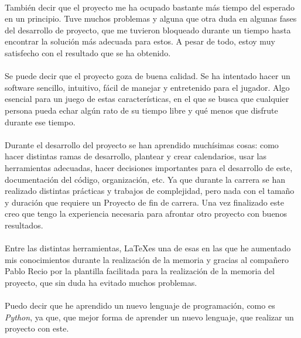 \documentclass[a4paper,11pt]{article} %
\begin{document}
\paragraph{}
También decir que el proyecto me ha ocupado bastante más tiempo del esperado en un principio. Tuve muchos problemas y alguna que 
otra duda en algunas fases del desarrollo de proyecto, que me tuvieron bloqueado durante un tiempo hasta encontrar la solución
más adecuada para estos. A pesar de todo, estoy muy satisfecho con el resultado que se ha obtenido.

\paragraph{}
Se puede decir que el proyecto goza de buena calidad. Se ha intentado hacer un
software sencillo, intuitivo, fácil de manejar y 
entretenido para el jugador. Algo esencial para un juego de estas características, en el que se busca que cualquier persona
pueda echar algún rato de su tiempo libre y qué menos que disfrute durante ese tiempo.

\paragraph{}
Durante el desarrollo del proyecto se han aprendido muchísimas cosas: como hacer distintas ramas de desarrollo, plantear y crear
calendarios, usar las herramientas adecuadas, hacer decisiones importantes para el desarrollo de este, documentación del 
código, organización, etc. Ya que durante la carrera se han realizado distintas prácticas y trabajos de complejidad, pero nada
con el tamaño y duración que requiere un Proyecto de fin de carrera. Una vez finalizado este creo que tengo la experiencia necesaria
para afrontar otro proyecto con buenos resultados.

\paragraph{}
Entre las distintas herramientas, \LaTeX es una de esas en las que he aumentado mis conocimientos durante la realización de la 
memoria y gracias al compañero Pablo Recio por la plantilla facilitada para la realización de la memoria del proyecto, que sin duda
ha evitado muchos problemas.

\paragraph{}
Puedo decir que he aprendido un nuevo lenguaje de programación, como es \emph{Python}, ya que, que mejor forma de aprender un 
nuevo lenguaje, que realizar un proyecto con este.
\end{document}
